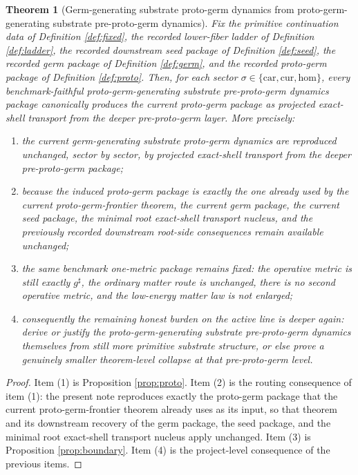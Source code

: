 \documentclass[11pt]{article}
\newcommand{\CompletedMetric}{g^{\sharp}}
\newcommand{\Car}{\mathrm{car}}
\newcommand{\Cur}{\mathrm{cur}}
\newcommand{\Hom}{\mathrm{hom}}
\newtheorem{theorem}{Theorem}
\begin{document}
\begin{theorem}[Germ-generating substrate proto-germ dynamics from proto-germ-generating substrate pre-proto-germ dynamics]
\label{thm:main}
Fix the primitive continuation data of Definition \ref{def:fixed}, the recorded lower-fiber ladder of Definition \ref{def:ladder}, the recorded downstream seed package of Definition \ref{def:seed}, the recorded germ package of Definition \ref{def:germ}, and the recorded proto-germ package of Definition \ref{def:proto}. Then, for each sector \(\sigma\in\{\Car,\Cur,\Hom\}\), every benchmark-faithful proto-germ-generating substrate pre-proto-germ dynamics package canonically produces the current proto-germ package as projected exact-shell transport from the deeper pre-proto-germ layer. More precisely:
\begin{enumerate}
    \item the current germ-generating substrate proto-germ dynamics are reproduced unchanged, sector by sector, by projected exact-shell transport from the deeper pre-proto-germ package;
    \item because the induced proto-germ package is exactly the one already used by the current proto-germ-frontier theorem, the current germ package, the current seed package, the minimal root exact-shell transport nucleus, and the previously recorded downstream root-side consequences remain available unchanged;
    \item the same benchmark one-metric package remains fixed: the operative metric is still exactly \(\CompletedMetric\), the ordinary matter route is unchanged, there is no second operative metric, and the low-energy matter law is not enlarged;
    \item consequently the remaining honest burden on the active line is deeper again: derive or justify the proto-germ-generating substrate pre-proto-germ dynamics themselves from still more primitive substrate structure, or else prove a genuinely smaller theorem-level collapse at that pre-proto-germ level.
\end{enumerate}
\end{theorem}

\begin{proof}
Item (1) is Proposition \ref{prop:proto}. Item (2) is the routing consequence of item (1): the present note reproduces exactly the proto-germ package that the current proto-germ-frontier theorem already uses as its input, so that theorem and its downstream recovery of the germ package, the seed package, and the minimal root exact-shell transport nucleus apply unchanged. Item (3) is Proposition \ref{prop:boundary}. Item (4) is the project-level consequence of the previous items.
\end{proof}
\end{document}
